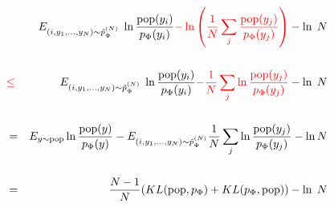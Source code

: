 {
{\huge
 \begin{eqnarray*}
    & & E_{(i,y_1,\ldots,y_{N}) \sim \tilde{p}_\Phi^{(N)}}\;\ln\frac{\mathrm{pop}(y_i)}{p_\Phi(y_i)} {\color{red} - \ln\left(\frac{1}{N}\sum_j \frac{\mathrm{pop}(y_j)}{p_\Phi(y_j)} \right)} - \ln\;N \\
    \\
    & {\color{red} \leq} & E_{(i,y_1,\ldots,y_{N}) \sim \tilde{p}_\Phi^{(N)}}\;\ln\frac{\mathrm{pop}(y_i)}{p_\Phi(y_i)} {\color{red} - \frac{1}{N} \sum_j \ln\frac{\mathrm{pop}(y_j)}{p_\Phi(y_j)}} - \ln\;N \\
    \\
    & = & E_{y \sim \mathrm{pop}} \ln \frac{\mathrm{pop}(y)}{p_\Phi(y)} -  E_{(i,y_1,\ldots,y_N) \sim \tilde{p}^{(N)}_\Phi} \frac{1}{N} \sum_j \ln\frac{\mathrm{pop}(y_j)}{p_\Phi(y_j)} - \ln N \\
    \\
    & = & \frac{N-1}{N}(KL(\mathrm{pop},p_\Phi) + KL(p_\Phi,\mathrm{pop})) - \ln\;N \\
  \end{eqnarray*}
}


}


